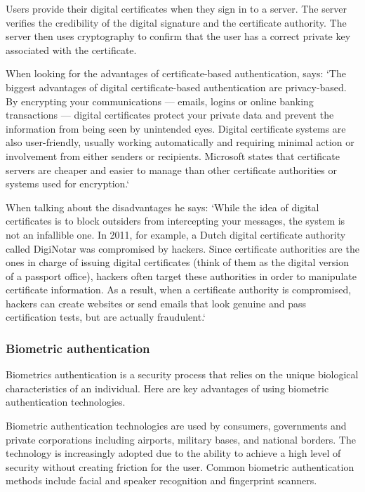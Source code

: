 Users provide their digital certificates when they sign in to a server. The server verifies the credibility of the digital signature and the certificate authority. The server then uses cryptography to confirm that the user has a correct private key associated with the certificate.

When looking for the advantages of certificate-based authentication, \textcite{Spector} says: `The biggest advantages of digital certificate-based authentication are privacy-based. By encrypting your communications — emails, logins or online banking transactions — digital certificates protect your private data and prevent the information from being seen by unintended eyes. Digital certificate systems are also user-friendly, usually working automatically and requiring minimal action or involvement from either senders or recipients. Microsoft states that certificate servers are cheaper and easier to manage than other certificate authorities or systems used for encryption.`

When talking about the disadvantages he says: `While the idea of digital certificates is to block outsiders from intercepting your messages, the system is not an infallible one. In 2011, for example, a Dutch digital certificate authority called DigiNotar was compromised by hackers. Since certificate authorities are the ones in charge of issuing digital certificates (think of them as the digital version of a passport office), hackers often target these authorities in order to manipulate certificate information. As a result, when a certificate authority is compromised, hackers can create websites or send emails that look genuine and pass certification tests, but are actually fraudulent.`

\subsubsection{Biometric authentication}

Biometrics authentication is a security process that relies on the unique biological characteristics of an individual. Here are key advantages of using biometric authentication technologies.

Biometric authentication technologies are used by consumers, governments and private corporations including airports, military bases, and national borders. The technology is increasingly adopted due to the ability to achieve a high level of security without creating friction for the user. Common biometric authentication methods include facial and speaker recognition and fingerprint scanners.

